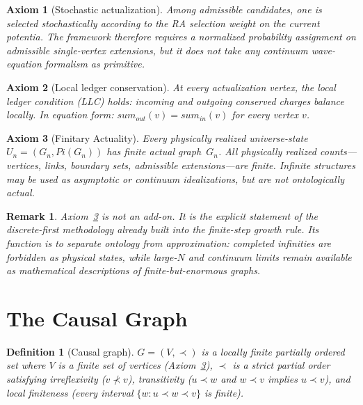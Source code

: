 \documentclass[11pt]{article}
\def\Pi{Pi}%
\def\mathrm#1{#1}%
\def\sum{sum}%
\newtheorem{axiom}{Axiom}
\newtheorem{definition}{Definition}
\newtheorem{remark}{Remark}
\newcommand{\Pot}{\Pi}
\begin{document}
\begin{axiom}[Stochastic actualization]
\label{ax:stochastic}
Among admissible candidates, one is selected stochastically according to the RA selection weight on the current potentia. The framework therefore requires a normalized probability assignment on admissible single-vertex extensions, but it does not take any continuum wave-equation formalism as primitive.
\end{axiom}

\begin{axiom}[Local ledger conservation]
\label{ax:llc}
At every actualization vertex, the local ledger condition (LLC) holds: incoming and outgoing conserved charges balance locally. In equation form: $\sum_{\mathrm{out}}(v)=\sum_{\mathrm{in}}(v)$ for every vertex $v$.
\end{axiom}

\begin{axiom}[Finitary Actuality]
\label{ax:finite}
Every physically realized universe-state $U_n=(G_n,\Pot(G_n))$ has finite actual graph~$G_n$. All physically realized counts---vertices, links, boundary sets, admissible extensions---are finite. Infinite structures may be used as asymptotic or continuum idealizations, but are not ontologically actual.
\end{axiom}

\begin{remark}
Axiom~\ref{ax:finite} is not an add-on. It is the explicit statement of the discrete-first methodology already built into the finite-step growth rule. Its function is to separate ontology from approximation: completed infinities are forbidden as physical states, while large-$N$ and continuum limits remain available as mathematical descriptions of finite-but-enormous graphs.
\end{remark}

\section{The Causal Graph}
\label{sec:graph}

\begin{definition}[Causal graph]
$G=(V,\prec)$ is a locally finite partially ordered set where $V$ is a finite set of vertices (Axiom~\ref{ax:finite}), $\prec$ is a strict partial order satisfying irreflexivity ($v\not\prec v$), transitivity ($u\prec w$ and $w\prec v$ implies $u\prec v$), and local finiteness (every interval $\{w:u\prec w\prec v\}$ is finite).
\end{definition}
\end{document}
